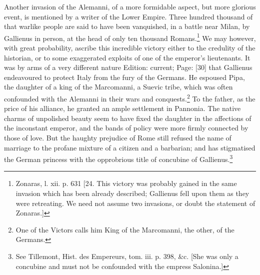 Another invasion of the Alemanni, of a more formidable aspect, but more glorious event, is mentioned by a writer of the Lower Empire. Three hundred thousand of that warlike people are said to have been vanquished, in a battle near Milan, by Gallienus in person, at the head of only ten thousand Romans.\footnote{Zonaras, l. xii. p. 631 [24. This victory was probably gained in the same invasion which has been already described; Gallienus fell upon them as they were retreating. We need not assume two invasions, or doubt the statement of Zonaras.]} We may however, with great probability, ascribe this incredible victory either to the credulity of the historian, or to some exaggerated exploits of one of the emperor\texthebrew{}’s lieutenants. It was by arms of a very different nature Edition: current; Page: [30] that Gallienus endeavoured to protect Italy from the fury of the Germans. He espoused Pipa, the daughter of a king of the Marcomanni, a Suevic tribe, which was often confounded with the Alemanni in their wars and conquests.\footnote{One of the Victors calls him King of the Marcomanni, the other, of the Germans.} To the father, as the price of his alliance, he granted an ample settlement in Pannonia. The native charms of unpolished beauty seem to have fixed the daughter in the affections of the inconstant emperor, and the bands of policy were more firmly connected by those of love. But the haughty prejudice of Rome still refused the name of marriage to the profane mixture of a citizen and a barbarian; and has stigmatised the German princess with the opprobrious title of concubine of Gallienus.\footnote{See Tillemont, Hist. des Empereurs, tom. iii. p. 398, \&c. [She was only a concubine and must not be confounded with the empress Salonina.]}

